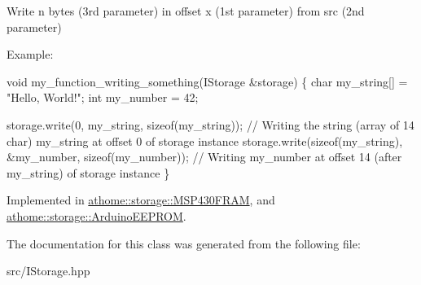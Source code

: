 Write n bytes (3rd parameter) in offset x (1st parameter) from src (2nd parameter)

Example\+:


\begin{DoxyCode}
\textcolor{keywordtype}{void} my\_function\_writing\_something(IStorage &storage) \{
  \textcolor{keywordtype}{char} my\_string[] = \textcolor{stringliteral}{"Hello, World!"};
  \textcolor{keywordtype}{int} my\_number = 42;

  storage.write(0, my\_string, \textcolor{keyword}{sizeof}(my\_string)); \textcolor{comment}{// Writing the string (array of 14 char) my\_string at
       offset 0 of storage instance}
  storage.write(\textcolor{keyword}{sizeof}(my\_string), &my\_number, \textcolor{keyword}{sizeof}(my\_number)); \textcolor{comment}{// Writing my\_number at offset 14 (after
       my\_string) of storage instance}
\}
\end{DoxyCode}
 

Implemented in \mbox{\hyperlink{classathome_1_1storage_1_1_m_s_p430_f_r_a_m_ae6b7a6d178233f9e54394360b34c3bca}{athome\+::storage\+::\+M\+S\+P430\+F\+R\+AM}}, and \mbox{\hyperlink{classathome_1_1storage_1_1_arduino_e_e_p_r_o_m_a20027ab8a5b20c1fad3e3e42daafe53d}{athome\+::storage\+::\+Arduino\+E\+E\+P\+R\+OM}}.



The documentation for this class was generated from the following file\+:\begin{DoxyCompactItemize}
\item 
src/I\+Storage.\+hpp\end{DoxyCompactItemize}
